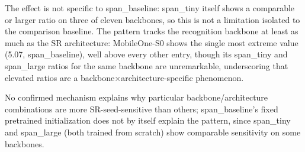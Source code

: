 \documentclass[pdflatex,sn-vancouver-num]{sn-jnl}
\begin{document}
The effect is not specific to span\_baseline: span\_tiny itself shows a comparable or larger ratio on three of eleven backbones, so this is not a limitation isolated to the comparison baseline. The pattern tracks the recognition backbone at least as much as the SR architecture: MobileOne-S0 shows the single most extreme value (5.07, span\_baseline), well above every other entry, though its span\_tiny and span\_large ratios for the same backbone are unremarkable, underscoring that elevated ratios are a backbone$\times$architecture-specific phenomenon.

No confirmed mechanism explains why particular backbone/architecture combinations are more SR-seed-sensitive than others; span\_baseline's fixed pretrained initialization does not by itself explain the pattern, since span\_tiny and span\_large (both trained from scratch) show comparable sensitivity on some backbones.

\clearpage

\end{document}
